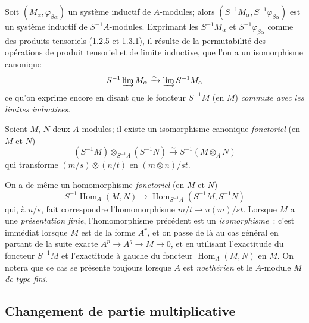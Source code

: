 \begin{env}[1.3.3]
\label{0.1.3.3-fr}
Soit $(M_\alpha,\varphi_{\beta\alpha})$ un système inductif de $A$-modules; alors $(S^{-1}M_\alpha,S^{-1}\varphi_{\beta\alpha})$ est un système inductif de $S^{-1}A$-modules.
Exprimant les $S^{-1}M_\alpha$ et $S^{-1}\varphi_{\beta\alpha}$ comme des produits tensoriels (1.2.5 et 1.3.1), il résulte de la permutabilité des opérations de produit tensoriel et de limite inductive, que l'on a un isomorphisme canonique
\[
  S^{-1}\varinjlim M_\alpha\xrightarrow{\sim}\varinjlim S^{-1}M_\alpha
\]
ce qu'on exprime encore en disant que le foncteur $S^{-1}M$ (en $M$) \emph{commute avec les limites inductives}.
\end{env}

\begin{env}[1.3.4]
\label{0.1.3.4-fr}
Soient $M$, $N$ deux $A$-modules; il existe un isomorphisme canonique \emph{fonctoriel} (en $M$ et $N$)
\[
  (S^{-1}M)\otimes_{S^{-1}A}(S^{-1}N)
  \xrightarrow{\sim}
  S^{-1}(M\otimes_A N)
\]
qui transforme $(m/s)\otimes(n/t)$ en $(m\otimes n)/st$.
\end{env}

\begin{env}[1.3.5]
\label{0.1.3.5-fr}
On a de même un homomorphisme \emph{fonctoriel} (en $M$ et $N$)
\[
  S^{-1}\operatorname{Hom}_A(M,N)
  \longrightarrow
  \operatorname{Hom}_{S^{-1}A}(S^{-1}M,S^{-1}N)
\]
qui, à $u/s$, fait correspondre l'homomorphisme $m/t\to u(m)/st$.
Lorsque $M$ a une \emph{présentation finie}, l'homomorphisme précédent est un \emph{isomorphisme}~: c'est immédiat lorsque $M$ est de la forme $A^r$, et on passe de là au cas général en partant de la suite exacte $A^p\to A^q\to M\to 0$, et en utilisant l'exactitude du foncteur $S^{-1}M$ et l'exactitude à gauche du foncteur $\operatorname{Hom}_A(M,N)$ en $M$.
On notera que ce cas se présente toujours lorsque $A$ est \emph{noethérien} et le $A$-module $M$ \emph{de type fini}.
\end{env}

\subsection{Changement de partie multiplicative}
\label{subsection:0.1.4-fr}

